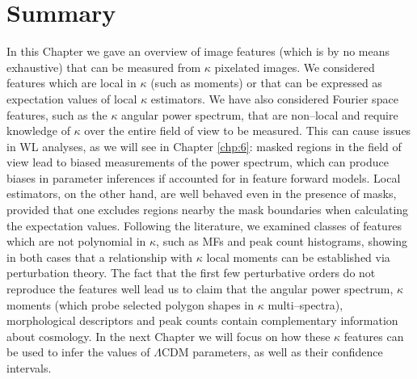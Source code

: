 \section{Summary}
In this Chapter we gave an overview of image features (which is by no means exhaustive) that can be measured from $\kappa$ pixelated images. We considered features which are local in $\kappa$ (such as moments) or that can be expressed as expectation values of local $\kappa$ estimators. We have also considered Fourier space features, such as the $\kappa$ angular power spectrum, that are non--local and require knowledge of $\kappa$ over the entire field of view to be measured. This can cause issues in WL analyses, as we will see in Chapter \ref{chp:6}: masked regions in the field of view lead to biased measurements of the power spectrum, which can produce biases in parameter inferences if accounted for in feature forward models. Local estimators, on the other hand, are well behaved even in the presence of masks, provided that one excludes regions nearby the mask boundaries when calculating the expectation values. Following the literature, we examined classes of features which are not polynomial in $\kappa$, such as MFs and peak count histograms, showing in both cases that a relationship with $\kappa$ local moments can be established via perturbation theory. The fact that the first few perturbative orders do not reproduce the features well lead us to claim that the angular power spectrum, $\kappa$ moments (which probe selected polygon shapes in $\kappa$ multi--spectra), morphological descriptors and peak counts contain complementary information about cosmology. In the next Chapter we will focus on how these $\kappa$ features can be used to infer the values of $\Lambda$CDM parameters, as well as their confidence intervals.

%